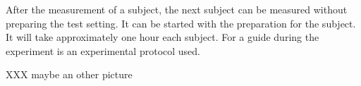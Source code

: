 After the measurement of a subject, the next subject can be measured without preparing the test setting. It can be started with the preparation for the subject. It will take approximately one hour each subject. For a guide during the experiment is an experimental protocol used.

XXX maybe an other picture
